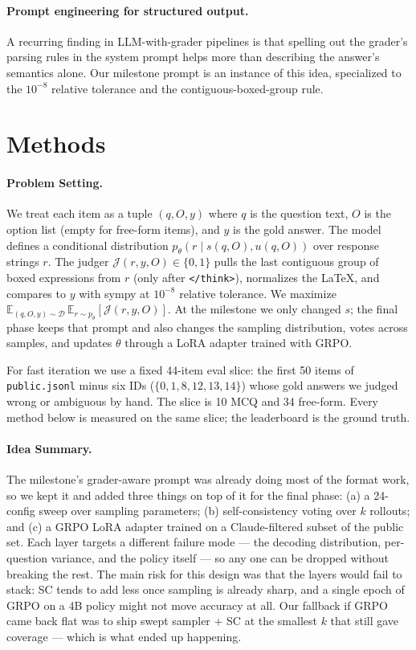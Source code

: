\documentclass{article}
\begin{document}
\paragraph{Prompt engineering for structured output.}
A recurring finding in LLM-with-grader pipelines is that spelling
out the grader's parsing rules in the system prompt helps more
than describing the answer's semantics alone. Our milestone
prompt is an instance of this idea, specialized to the
$10^{-8}$ relative tolerance and the contiguous-boxed-group rule.


\section{Methods}
\label{sec:methods}

\paragraph{Problem Setting.}
We treat each item as a tuple $(q, O, y)$ where $q$ is the
question text, $O$ is the option list (empty for free-form items),
and $y$ is the gold answer. The model defines a conditional
distribution $p_\theta(r \mid s(q, O), u(q, O))$ over response
strings $r$. The judger $\mathcal{J}(r, y, O) \in \{0, 1\}$
pulls the last contiguous group of boxed expressions from $r$
(only after \texttt{</think>}), normalizes the LaTeX, and compares
to $y$ with sympy at $10^{-8}$ relative tolerance. We maximize
$\mathbb{E}_{(q,O,y)\sim\mathcal{D}}\,\mathbb{E}_{r\sim p_\theta}[\mathcal{J}(r,y,O)]$.
At the milestone we only changed $s$; the final phase keeps that
prompt and also changes the sampling distribution, votes across
samples, and updates $\theta$ through a LoRA adapter trained
with GRPO.

For fast iteration we use a fixed 44-item eval slice: the first
50 items of \texttt{public.jsonl} minus six IDs
($\{0, 1, 8, 12, 13, 14\}$) whose gold answers we judged wrong or
ambiguous by hand. The slice is 10 MCQ and 34 free-form. Every
method below is measured on the same slice; the leaderboard is
the ground truth.

\paragraph{Idea Summary.}
The milestone's grader-aware prompt was already doing most of
the format work, so we kept it and added three things on top of
it for the final phase: (a) a 24-config sweep over sampling
parameters; (b) self-consistency voting over $k$ rollouts; and
(c) a GRPO LoRA adapter trained on a Claude-filtered subset of
the public set. Each layer targets a different failure mode ---
the decoding distribution, per-question variance, and the policy
itself --- so any one can be dropped without breaking the rest.
The main risk for this design was that the layers would fail to
stack: SC tends to add less once sampling is already sharp, and
a single epoch of GRPO on a 4B policy might not move accuracy at
all. Our fallback if GRPO came back flat was to ship swept
sampler $+$ SC at the smallest $k$ that still gave coverage ---
which is what ended up happening.
\end{document}
